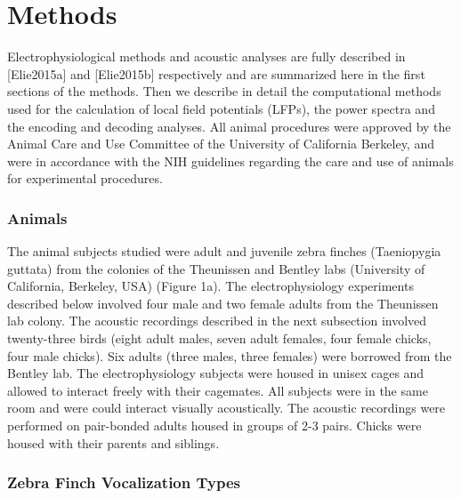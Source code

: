 \chapter{Methods}

Electrophysiological methods and acoustic analyses are fully described in [Elie2015a] and [Elie2015b] respectively and are summarized here in the first sections of the methods. Then we describe in detail the computational methods used for the calculation of local field potentials (LFPs), the power spectra and the encoding and decoding analyses. All animal procedures were approved by the Animal Care and Use Committee of the University of California Berkeley, and were in accordance with the NIH guidelines regarding the care and use of animals for experimental procedures.

\subsection{Animals}

The animal subjects studied were adult and juvenile zebra finches (Taeniopygia guttata) from the colonies of the Theunissen and Bentley labs (University of California, Berkeley, USA) (Figure 1a). The electrophysiology experiments described below involved four male and two female adults from the Theunissen lab colony. The acoustic recordings described in the next subsection involved twenty-three birds (eight adult males, seven adult females, four female chicks, four male chicks). Six adults (three males, three females) were borrowed from the Bentley lab.
The electrophysiology subjects were housed in unisex cages and allowed to interact freely with their cagemates. All subjects were in the same room and were could interact visually acoustically. The acoustic recordings were performed on pair-bonded adults housed in groups of 2-3 pairs. Chicks were housed with their parents and siblings.
    
\subsection{Zebra Finch Vocalization Types}


